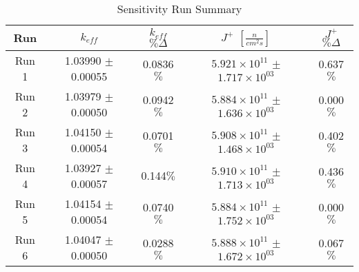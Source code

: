 
\begin{table}[H]
\centering
 \begin{tabularx}{0.7\textwidth}{c  c  c  c  c}
 	\hline
 	Run & $k_{eff}$ & $k_{eff}$ $\% \Delta$ & $J^+$  $[\frac{n}{cm^2s}]$ & $J^+$ $\% \Delta$  \\
 	\hline
 	Run 1 & 1.03990 $\pm$ 0.00055 & 0.0836$\%$ & $5.921\times10^{11}$ $\pm$ $1.717\times10^{03}$ & 0.637$\%$ \\
 	Run 2 & 1.03979 $\pm$ 0.00050 & 0.0942$\%$ & $5.884\times10^{11}$ $\pm$ $1.636\times10^{03}$ & 0.000$\%$ \\
 	Run 3 & 1.04150 $\pm$ 0.00054 & 0.0701$\%$ & $5.908\times10^{11}$ $\pm$ $1.468\times10^{03}$ & 0.402$\%$ \\
 	Run 4 & 1.03927 $\pm$ 0.00057 & 0.144$\%$ & $5.910\times10^{11}$ $\pm$ $1.713\times10^{03}$ & 0.436$\%$ \\
 	Run 5 & 1.04154 $\pm$ 0.00054 & 0.0740$\%$ & $5.884\times10^{11}$ $\pm$ $1.752\times10^{03}$ & 0.000$\%$ \\
 	Run 6 & 1.04047 $\pm$ 0.00050 & 0.0288$\%$ & $5.888\times10^{11}$ $\pm$ $1.672\times10^{03}$ & 0.067$\%$ \\
 	\hline

 \end{tabularx}
\caption{Sensitivity Run Summary}
\label{table:slicesens}
\end{table}